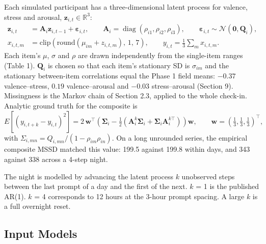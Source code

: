 \documentclass[11pt,letterpaper]{article}
\begin{document}
Each simulated participant has a three-dimensional latent process for valence, stress and arousal, $\mathbf{z}_{i,t} \in \mathbb{R}^3$:
\begin{align}
\mathbf{z}_{i,t} &= \mathbf{A}_i \mathbf{z}_{i,t-1} + \boldsymbol{\varepsilon}_{i,t}, \qquad \mathbf{A}_i = \operatorname{diag}(\rho_{i1}, \rho_{i2}, \rho_{i3}), \qquad \boldsymbol{\varepsilon}_{i,t} \sim \mathcal{N}(\mathbf{0}, \mathbf{Q}_i), \\
x_{i,t,m} &= \text{clip}\left(\text{round}(\mu_{im} + z_{i,t,m}),\, 1,\, 7\right), \qquad y_{i,t} = \tfrac{1}{3}\textstyle\sum_{m} x_{i,t,m} .
\end{align}
Each item's $\mu$, $\sigma$ and $\rho$ are drawn independently from the single-item ranges (Table 1). $\mathbf{Q}_i$ is chosen so that each item's stationary SD is $\sigma_{im}$ and the stationary between-item correlations equal the Phase 1 field means: $-0.37$ valence--stress, $0.19$ valence--arousal and $-0.03$ stress--arousal (Section 9). Missingness is the Markov chain of Section 2.3, applied to the whole check-in. Analytic ground truth for the composite is
\begin{equation}
E\left[(y_{i,t+k} - y_{i,t})^2\right] = 2\,\mathbf{w}^\top\left(\boldsymbol{\Sigma}_i - \tfrac{1}{2}(\mathbf{A}_i^k\boldsymbol{\Sigma}_i + \boldsymbol{\Sigma}_i \mathbf{A}_i^{k\top})\right)\mathbf{w}, \qquad \mathbf{w} = (\tfrac13, \tfrac13, \tfrac13)^\top,
\end{equation}
with $\Sigma_{i,mn} = Q_{i,mn} / (1 - \rho_{im}\rho_{in})$. On a long unrounded series, the empirical composite MSSD matched this value: 199.5 against 199.8 within days, and 343 against 338 across a 4-step night.

The night is modelled by advancing the latent process $k$ unobserved steps between the last prompt of a day and the first of the next. $k$ = 1 is the published AR(1). $k$ = 4 corresponds to 12 hours at the 3-hour prompt spacing. A large $k$ is a full overnight reset.

\subsection{Input Models}
\end{document}
